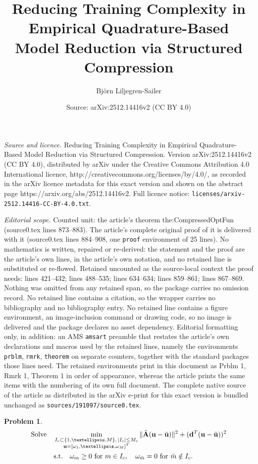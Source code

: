 \documentclass[10pt,a4paper]{amsart}
\title{Reducing Training Complexity in Empirical Quadrature-Based Model Reduction via Structured Compression}
\author{Bj\"orn Liljegren-Sailer}
\date{Source: arXiv:2512.14416v2 (CC BY 4.0)}
\newtheorem{prblm}{Problem}
\newcommand{\Ap}{{\bt{A}}}
\newcommand{\bt}[1]{{\mathbf{#1}}}
\newcommand{\bv}[1]{{\mathbf #1}}
\newcommand{\com}[1]{{{#1}_{\rm{c}}}} %
\newcommand{\dreg}{{{\bv{d}}}}
\newcommand{\vwei}{\bv{u}} %
\newcommand{\wei}{{\omega}} %
\begin{document}
\maketitle

\noindent\emph{Source and licence.} Reducing Training Complexity in Empirical Quadrature-Based Model Reduction via Structured Compression. Version arXiv:2512.14416v2 (CC BY 4.0), distributed by arXiv under the Creative Commons Attribution 4.0 International licence, http://creativecommons.org/licenses/by/4.0/, as recorded in the arXiv licence metadata for this exact version and shown on the abstract page https://arxiv.org/abs/2512.14416v2. Full licence notice: \texttt{licenses/arxiv-2512.14416-CC-BY-4.0.txt}.\par\smallskip

\noindent\textit{Editorial scope.} Counted unit: the article's theorem the:CompressedOptFun (source0.tex lines 873--883). The article's complete original proof of it is delivered with it (source0.tex lines 884--908, one \texttt{proof} environment of 25 lines). No mathematics is written, repaired or re-derived: the statement and the proof are the article's own lines, in the article's own notation, and no retained line is substituted or re-flowed.  Retained uncounted as the source-local context the proof needs: lines 421--432; lines 488--535; lines 634--634; lines 859--861; lines 867--869.  Nothing was omitted from any retained span, so the package carries no omission record.  No retained line contains a citation, so the wrapper carries no bibliography and no bibliography entry.  No retained line contains a figure environment, an image-inclusion command or drawing code, so no image is delivered and the package declares no asset dependency.  Editorial formatting only, in addition: an AMS \texttt{amsart} preamble that restates the article's own declarations and macros used by the retained lines, namely the environments \texttt{prblm}, \texttt{rmrk}, \texttt{theorem} on separate counters, together with the standard packages those lines need.  The retained environments print in this document as Prblm 1, Rmrk 1, Theorem 1 in order of appearance, whereas the article prints the same items with the numbering of its own full document.  The complete native source of the article as distributed in the arXiv e-print for this exact version is bundled unchanged as \texttt{sources/191097/source0.tex}.
\begin{prblm}\label{prob:unc-CrTrain}
\begin{align*}
\text{Solve} \quad & \min_{\substack{I_c \subset \{1,\ldots,M\},\, |I_c| \leq \com{M} \\ \vwei=[\wei_1,\ldots,\wei_M]^T}} 
\| \tilde{\Ap}(\vwei - \tilde{\vwei}) \|^2 + (\dreg^T(\vwei - \tilde{\vwei}))^2 \\
& \text{s.t.} \quad \wei_m \geq 0 \text{ for } m \in I_c,\quad \wei_{\bar{m}} = 0 \text{ for } \bar{m} \notin I_c.
\end{align*}
\end{prblm}
\end{document}
